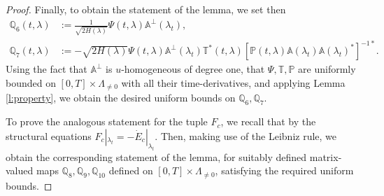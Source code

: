 \documentclass[10pt,a4paper]{amsart}
\newcommand{\A}{\mathbb{A}}
\renewcommand{\P}{\mathbb{P}}
\newcommand{\Q}{\mathbb{Q}}
\begin{document}
\begin{proof}
Finally, to obtain the statement of the lemma, we set then
\begin{align}
\Q_6(t,\lambda) & := \frac{1}{\sqrt{2H(\lambda)}}\Psi(t,\lambda) \A^\perp(\lambda_t), \\
\Q_7(t,\lambda) & :=  -\sqrt{2H(\lambda)}\Psi(t,\lambda)\A^\perp(\lambda_t)\mathbb{T}^*(t,\lambda)\left[\P(t,\lambda)\A(\lambda_t)\A(\lambda_t)^*\right]^{-1*}.
\end{align}
Using the fact that $\A^\perp$ is $u$-homogeneous of degree one, that $\Psi,\mathbb{T},\P$ are uniformly bounded on $[0,T]\times \Lambda_{\neq 0}$ with all their time-derivatives, and applying Lemma \ref{l:property}, we obtain the desired uniform bounds on $\Q_6,\Q_7$.

To prove the analogous statement for the tuple $F_c$, we recall that by the structural equations
$F_c|_{\lambda_t} = -\dot{E}_c|_{\lambda_t}$. Then, making use of the Leibniz rule, we obtain the corresponding statement of the lemma, for suitably defined matrix-valued maps $\Q_8,\Q_9,\Q_{10}$ defined on $[0,T]\times \Lambda_{\neq 0}$, satisfying the required uniform bounds.
\end{proof}
\end{document}
